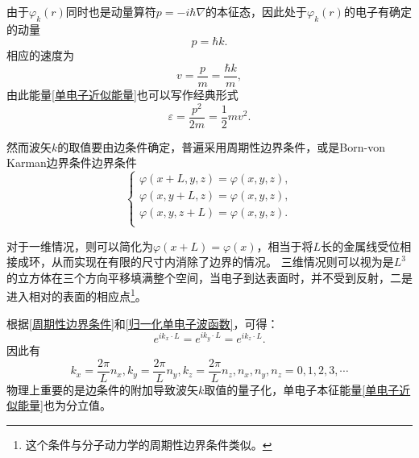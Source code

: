         由于$\varphi_k(r)$同时也是动量算符$p=-i\hbar\nabla$的本征态，因此处于$\varphi_k(r)$的电子有确定的动量
        \begin{equation}
            p=\hbar k\label{电子动量与波矢关系}.
        \end{equation}
        相应的速度为
        \begin{equation}
            v=\frac{p}{m}=\frac{\hbar k}{m},
        \end{equation}
        由此能量\autoref{单电子近似能量}也可以写作经典形式
        \begin{equation}
           \varepsilon=\frac{p^2}{2m}=\frac{1}{2}mv^2\label{单电子近似能量经典形式}.
        \end{equation}

        然而波矢$k$的取值要由边条件确定，普遍采用周期性边界条件，或是Born-von Karman边界条件边界条件
        \begin{equation}
            \left\{
                \begin{aligned}
                    \varphi(x+L,y,z)=\varphi(x,y,z),\\
                    \varphi(x,y+L,z)=\varphi(x,y,z),\\
                    \varphi(x,y,z+L)=\varphi(x,y,z).\\
                \end{aligned}\label{周期性边界条件}\right.
        \end{equation}

        对于一维情况，则可以简化为$ \varphi(x+L)=\varphi(x)$，相当于将$L$长的金属线受位相接成环，从而实现在有限的尺寸内消除了边界的情况。
        三维情况则可以视为是$L^3$的立方体在三个方向平移填满整个空间，当电子到达表面时，并不受到反射，二是进入相对的表面的相应点\footnote{这个条件与分子动力学的周期性边界条件类似。}。

        根据\autoref{周期性边界条件}和\autoref{归一化单电子波函数}，可得：
        \begin{equation}
            e^{ik_x\cdot L}=e^{ik_y\cdot L}=e^{ik_z\cdot L}.
        \end{equation}
        因此有
        \begin{equation}
            k_x=\frac{2\pi}{L}n_x,k_y=\frac{2\pi}{L}n_y,k_z=\frac{2\pi}{L}n_z,n_x,n_y,n_z=0,1,2,3,\cdots
        \end{equation}
        物理上重要的是边条件的附加导致波矢$k$取值的量子化，单电子本征能量\autoref{单电子近似能量}也为分立值。

